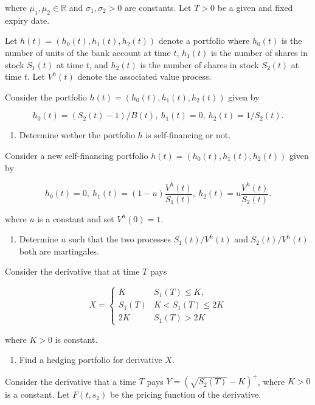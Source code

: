 \documentclass[
]{book}
\providecommand{\tightlist}{%
  \setlength{\itemsep}{0pt}\setlength{\parskip}{0pt}}
\begin{document}
where \(\mu_1,\mu_2\in\mathbb{R}\) and \(\sigma_1,\sigma_2>0\) are constants. Let \(T>0\) be a given and fixed expiry date.

Let \(h(t)=(h_0(t),h_1(t),h_2(t))\) denote a portfolio where \(h_0(t)\) is the number of units of the bank account at time \(t\), \(h_1(t)\) is the number of shares in stock \(S_1(t)\) at time \(t\), and \(h_2(t)\) is the number of shares in stock \(S_2(t)\) at time \(t.\) Let \(V^h(t)\) denote the associated value process.

Consider the portfolio \(h(t)=(h_0(t),h_1(t),h_2(t))\) given by

\[
h_0(t)=(S_2(t)-1)/B(t),\ h_1(t)=0,\ h_2(t)=1/S_2(t).
\]

\begin{enumerate}
\def\labelenumi{\alph{enumi}.}
\tightlist
\item
  Determine wether the portfolio \(h\) is self-financing or not.
\end{enumerate}

Consider a new self-financing portfolio \(h(t)=(h_0(t),h_1(t),h_2(t))\) given by

\[
h_0(t)=0,\ h_1(t)=(1-u)\frac{V^h(t)}{S_1(t)},\ h_2(t)=u\frac{V^h(t)}{S_2(t)}.
\]

where \(u\) is a constant and set \(V^h(0)=1\).

\begin{enumerate}
\def\labelenumi{\alph{enumi}.}
\setcounter{enumi}{1}
\tightlist
\item
  Determine \(u\) such that the two processes \(S_1(t)/V^h(t)\) and \(S_2(t)/V^h(t)\) both are martingales.
\end{enumerate}

Consider the derivative that at time \(T\) pays

\[
X=
\begin{cases}
K & S_1(T)\le K,\\
S_1(T) & K<S_1(T)\le 2K\\
2K & S_1(T)>2K
\end{cases}
\]

where \(K>0\) is constant.

\begin{enumerate}
\def\labelenumi{\alph{enumi}.}
\setcounter{enumi}{2}
\tightlist
\item
  Find a hedging portfolio for derivative \(X\).
\end{enumerate}

Consider the derivative that a time \(T\) pays \(Y=\left(\sqrt{S_2(T)}-K\right)^+\), where \(K>0\) is a constant. Let \(F(t,s_2)\) be the pricing function of the derivative.
\end{document}
